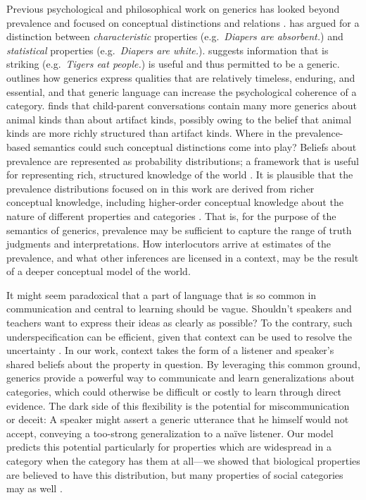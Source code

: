 \documentclass[10pt,letterpaper]{article}
\begin{document}
Previous psychological and philosophical work on generics has looked beyond prevalence and focused on conceptual distinctions and relations \cite{Gelman2005, Prasada2013, Leslie2007, Leslie2008}. 
\citeauthor{Prasada2013} has argued for a distinction between \emph{characteristic} properties (e.g.~\emph{Diapers are absorbent.}) and \emph{statistical} properties (e.g.~\emph{Diapers are white.}).
\citeauthor{Leslie2007} suggests information that is striking (e.g.~\emph{Tigers eat people.}) is useful and thus permitted to be a generic.
\citeauthor{Gelman2005} outlines how generics express qualities that are relatively timeless, enduring, and essential, and that generic language can increase the psychological coherence of a category.
 finds that child-parent conversations contain many more generics about animal kinds than about artifact kinds, possibly owing to the belief that animal kinds are more richly structured than artifact kinds. 
Where in the prevalence-based semantics could such conceptual distinctions come into play?
Beliefs about prevalence are represented as probability distributions; a framework that is useful for representing rich, structured knowledge of the world \cite{Goodmanconcepts}. 
It is plausible that the prevalence distributions focused on in this work are derived from richer conceptual knowledge, including higher-order conceptual knowledge about the nature of different properties and categories \cite{Gelman2005, Keil1992}. 
That is, for the purpose of the semantics of generics, prevalence may be sufficient to capture the range of truth judgments and interpretations. 
How interlocutors arrive at estimates of the prevalence, and what other inferences are licensed in a context, may be the result of a deeper conceptual model of the world. 

It might seem paradoxical that a part of language that is so common in communication and central to learning should be vague. 
Shouldn't speakers and teachers want to express their ideas as clearly as possible?
To the contrary, such underspecification can be efficient, given that context can be used to resolve the uncertainty \cite{Piantadosi2012}.
In our work, context takes the form of a listener and speaker's shared beliefs about the property in question. 
By leveraging this common ground, generics provide a powerful way to communicate and learn generalizations about categories, which could otherwise be difficult or costly to learn through direct evidence.
The dark side of this flexibility is the potential for miscommunication or deceit: A speaker might assert a generic utterance that he himself would not accept, conveying a too-strong generalization to a na\"{i}ve listener.  
Our model predicts this potential particularly for properties which are widespread in a category when the category has them at all---we showed that biological properties are believed to have this distribution, but many properties of social categories may as well \cite{Cimpian2011a, Cimpian2012b, Rhodes2012}.
\end{document}
